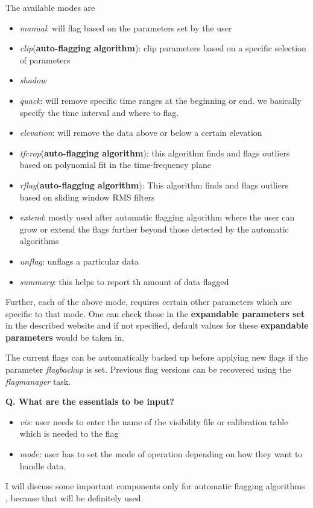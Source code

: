 \documentclass[10pt]{report}
\newcommand{\tbf}[1]{\textbf{#1}}
\newcommand{\tit}[1]{\textit{#1}}
\newcommand{\cbox}{tcolorbox}
\begin{document}
The available modes are 
\begin{itemize}
\item \tit{manual}: will flag based on the parameters set by the user
\item \tit{clip}(\tbf{auto-flagging algorithm}): clip parameters based on a specific selection of parameters
\item \tit{shadow}
\item \tit{quack}: will remove specific time ranges at the beginning or end. we basically specify the time interval and where to flag.
\item \tit{elevation}: will remove the data above or below a certain elevation
\item \tit{tfcrop}(\tbf{auto-flagging algorithm}): this algorithm finds and flags outliers based on polynomial fit in the time-frequency plane
\item \tit{rflag}(\tbf{auto-flagging algorithm}): This algorithm finds and flags outliers based on sliding window RMS filters
\item \tit{extend}: mostly used after automatic flagging algorithm where the user can grow or extend the flags further beyond those detected by the automatic algorithms
\item \tit{unflag}: unflags a particular data
\item \tit{summary}: this helps to report th amount of data flagged
\end{itemize}
Further, each of the above mode, requires certain other parameters which are specific to that mode. One can check those in the \tbf{expandable parameters set} in the described  website and if not specified, default values for these \tbf{expandable parameters} would be taken in.
\begin{\cbox}
The current flags can be automatically backed up before applying new flags if the parameter \tit{flagbackup} is set. Previous flag versions can be recovered using the \tit{flagmanager} task.
\end{\cbox}
\tbf{Q. What are the essentials to be input?}\\
\begin{itemize}
\item \tit{vis:} user needs to enter the name of the visibility file or calibration table which is needed to the flag
\item \tit{mode:} user has to set the mode of operation depending on how they want to handle data.
\end{itemize}
I will discuss some important components only for automatic flagging algorithms , because that will be definitely used.\\
\end{document}

